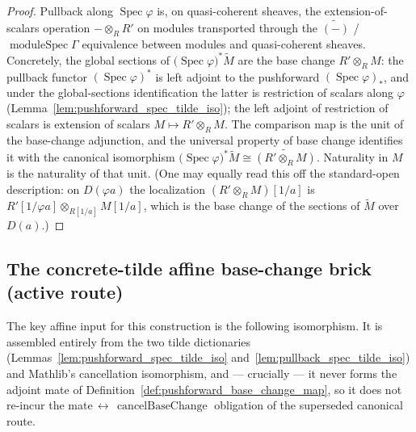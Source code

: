 \begin{proof}
  \leanok
  Pullback along \(\operatorname{Spec}\varphi\) is, on quasi-coherent sheaves, the
  extension-of-scalars operation \(- \otimes_R R'\) on modules transported through
  the \(\widetilde{(-)}\) / \(\operatorname{moduleSpec}\Gamma\) equivalence between
  modules and quasi-coherent sheaves. Concretely, the global sections of
  \(\bigl(\operatorname{Spec}\varphi\bigr)^{*}\widetilde{M}\) are the base change
  \(R' \otimes_R M\): the pullback functor \((\operatorname{Spec}\varphi)^{*}\) is
  left adjoint to the pushforward \((\operatorname{Spec}\varphi)_{*}\), and under
  the global-sections identification the latter is restriction of scalars along
  \(\varphi\) (Lemma~\ref{lem:pushforward_spec_tilde_iso}); the left adjoint of
  restriction of scalars is extension of scalars \(M \mapsto R' \otimes_R M\). The
  comparison map is the unit of the base-change adjunction, and the universal
  property of base change identifies it with the canonical isomorphism
  \(\bigl(\operatorname{Spec}\varphi\bigr)^{*}\widetilde{M} \cong
  \widetilde{(R' \otimes_R M)}\). Naturality in \(M\) is the naturality of that
  unit. (One may equally read this off the standard-open description: on
  \(D(\varphi a)\) the localization \((R' \otimes_R M)[1/a]\) is
  \(R'[1/\varphi a] \otimes_{R[1/a]} M[1/a]\), which is the base change of the
  sections of \(\widetilde M\) over \(D(a)\).)
\end{proof}

\subsection{The concrete-tilde affine base-change brick (active route)}
\label{subsec:fbc_concrete_brick}

The key affine input for this construction is the following isomorphism. It
is assembled entirely from the two tilde dictionaries
(Lemmas~\ref{lem:pushforward_spec_tilde_iso} and~\ref{lem:pullback_spec_tilde_iso}) and
Mathlib's cancellation isomorphism, and --- crucially --- it never forms the adjoint
mate of Definition~\ref{def:pushforward_base_change_map}, so it does not re-incur the
mate\(\,\leftrightarrow\,\operatorname{cancelBaseChange}\) obligation of the
superseded canonical route.

